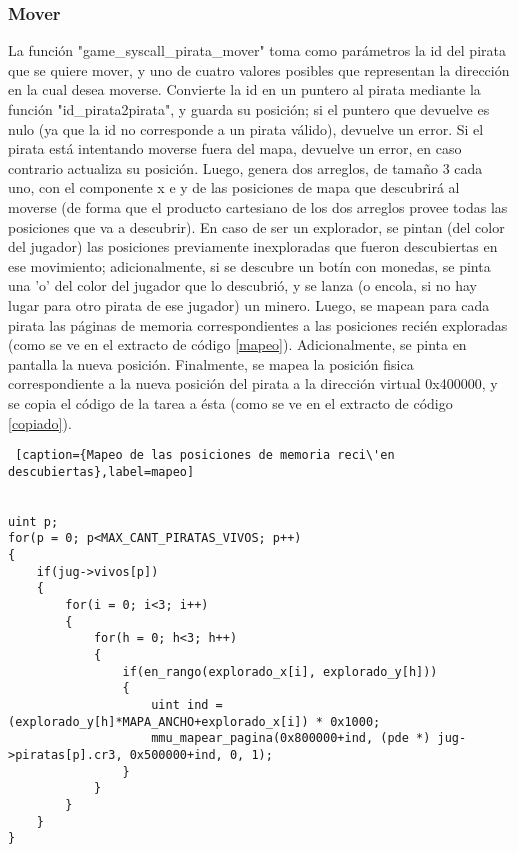 \subsubsection*{Mover}
\par La funci\'on "game_syscall_pirata_mover" toma como par\'ametros la id del pirata que se quiere mover, y uno de cuatro valores posibles que representan la direcci\'on en la cual desea moverse. 
Convierte la id en un puntero al pirata mediante la funci\'on "id_pirata2pirata", y guarda su posici\'on; si el puntero que devuelve es nulo (ya que la id no corresponde a un pirata v\'alido), devuelve un error.
Si el pirata est\'a intentando moverse fuera del mapa, devuelve un error, en caso contrario actualiza su posici\'on.
Luego, genera dos arreglos, de tama\~no 3 cada uno, con el componente x e y de las posiciones de mapa que descubrir\'a al moverse (de forma que el producto cartesiano de los dos arreglos provee todas las posiciones que va a descubrir).
En caso de ser un explorador, se pintan (del color del jugador) las posiciones previamente inexploradas que fueron descubiertas en ese movimiento; adicionalmente, si se descubre un bot\'in con monedas, se pinta una 'o' del color del jugador que lo descubri\'o, y se lanza (o encola, si no hay lugar para otro pirata de ese jugador) un minero.
Luego, se mapean para cada pirata las p\'aginas de memoria correspondientes a las posiciones reci\'en exploradas (como se ve en el extracto de c\'odigo \ref{mapeo}).
Adicionalmente, se pinta en pantalla la nueva posici\'on. Finalmente, se mapea la posici\'on fisica correspondiente a la nueva posici\'on del pirata a la direcci\'on virtual 0x400000, y se copia el c\'odigo de la tarea a \'esta (como se ve en el extracto de c\'odigo \ref{copiado}).



\begin{lstlisting} [caption={Mapeo de las posiciones de memoria reci\'en descubiertas},label=mapeo]


uint p;
for(p = 0; p<MAX_CANT_PIRATAS_VIVOS; p++)
{
    if(jug->vivos[p])
    {
        for(i = 0; i<3; i++)
        {
            for(h = 0; h<3; h++)
            {			
                if(en_rango(explorado_x[i], explorado_y[h]))
                {
                    uint ind = (explorado_y[h]*MAPA_ANCHO+explorado_x[i]) * 0x1000;
                    mmu_mapear_pagina(0x800000+ind, (pde *) jug->piratas[p].cr3, 0x500000+ind, 0, 1);
                }
            }
        }
    }
}

\end{lstlisting}



